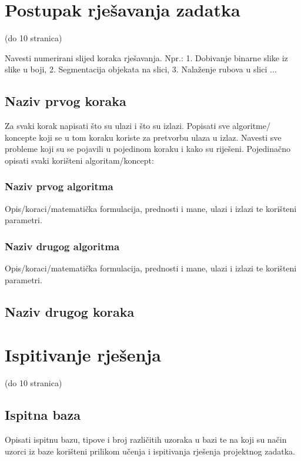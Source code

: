\documentclass[times, utf8, diplomski]{fer}
\begin{document}
\chapter{Postupak rješavanja zadatka}

(do 10 stranica)

Navesti numerirani slijed koraka rješavanja. Npr.: 1. Dobivanje binarne slike iz slike u boji, 2. Segmentacija objekata na slici, 3. Nalaženje rubova u slici ...

\section{Naziv prvog koraka}

Za svaki korak napisati što su ulazi i što su izlazi. Popisati sve algoritme/ koncepte koji se u tom koraku koriste za pretvorbu ulaza u izlaz. Navesti sve probleme koji su se pojavili u pojedinom koraku i kako su riješeni. Pojedinačno opisati svaki korišteni algoritam/koncept:

\subsection{Naziv prvog algoritma}

Opis/koraci/matematička formulacija, prednosti i mane, ulazi i izlazi te korišteni parametri.

\subsection{Naziv drugog algoritma}

Opis/koraci/matematička formulacija, prednosti i mane, ulazi i izlazi te korišteni parametri.

\section{Naziv drugog koraka}

\chapter{Ispitivanje rješenja}

(do 10 stranica)

\section{Ispitna baza}

Opisati ispitnu bazu, tipove i broj različitih uzoraka u bazi te na koji su način uzorci iz baze korišteni prilikom učenja i ispitivanja rješenja projektnog zadatka. 
\end{document}
